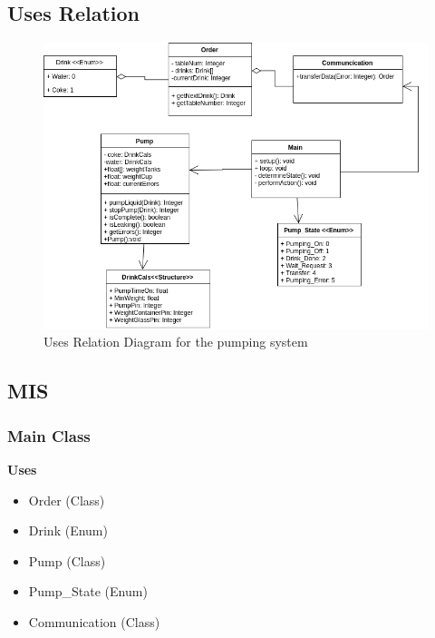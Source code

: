 \documentclass [10pt]{article}
\begin{document}
\subsection{Uses Relation}
\begin{figure} [h!]
	\centering
	\includegraphics [scale = 0.4] {figures/Pumping_UsesDiagram.png}
	\caption{Uses Relation Diagram for the pumping system}
\end{figure}


\subsection{MIS}


\subsubsection{Main Class}

\textbf{Uses}
\begin{itemize}
	\item Order (Class)
	\item Drink (Enum)
	\item Pump (Class)
	\item Pump\_State (Enum)
	\item Communication (Class)
\end{itemize}
\end{document}
